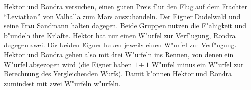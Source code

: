 \medskip
\begin{ruleexample}
    Hektor und Rondra versuchen, einen guten Preis f"ur den Flug auf dem Frachter "`Leviathan"' von Valhalla zum Mars auszuhandeln. Der Eigner Dudelwald und seine Frau Sandmann halten dagegen. Beide Gruppen nutzen die F"ahigkeit  und b"undeln ihre Kr"afte. Hektor hat nur einen W"urfel zur Verf"ugung, Rondra dagegen zwei. Die beiden Eigner haben jeweils einen W"urfel zur Verf"ugung. Hektor und Rondra gehen also mit drei W"urfeln ins Rennen, von denen ein W"urfel abgezogen wird (die Eigner haben $1+1$ W"urfel minus ein W"urfel zur Berechnung des Vergleichenden Wurfs). Damit k"onnen Hektor und Rondra zumindest mit zwei W"urfeln w"urfeln.
\end{ruleexample}
